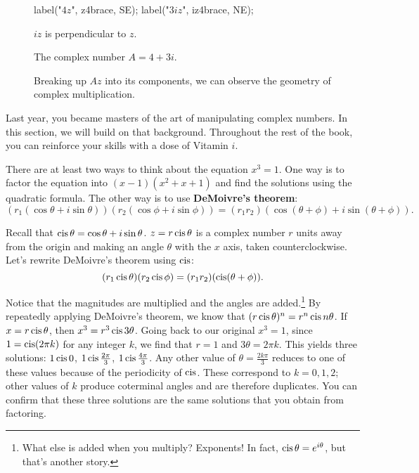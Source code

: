 \documentclass[../textbook.tex]{subfiles}
\begin{document}
\begin{figure}[h]
\begin{center}
\begin{minipage}[b]{0.4\textwidth}
\begin{asy}[width=0.7\textwidth]
				label("$4z$", z4brace, SE);
				label("$3iz$", iz4brace, NE);
			\end{asy}
		\end{minipage}
	\end{center}
	\vspace*{-2\baselineskip}
	\begin{center}
		\begin{minipage}[t]{0.25\textwidth}
			\caption{$iz$ is perpendicular to $z$.}
			\label{fig:izzperp}
		\end{minipage}
		\hfill
		\begin{minipage}[t]{0.25\textwidth}
			\caption{The complex number $A=4+3i$.}
			\label{fig:lol}
		\end{minipage}
		\hfill
		\begin{minipage}[t]{0.4\textwidth}
			\caption{Breaking up $Az$ into its components, we can observe the geometry of complex multiplication.}
		\end{minipage}
	\end{center}
	\vspace*{-2\baselineskip}
\end{figure}

\noindent Last year, you became masters of the art of manipulating complex numbers. In this section, we will build on that background. Throughout the rest of the book, you can reinforce your skills with a dose of Vitamin $i$.

There are at least two ways to think about the equation $x^3 = 1$. One way is to factor the equation into $(x-1)(x^2+x+1)$ and find the solutions using the quadratic formula. The other way is to use \textbf{DeMoivre’s theorem}:
\[(r_1 (\cos \theta + i \sin \theta)) (r_2 (\cos \phi + i \sin \phi)) = (r_1r_2) (\cos(\theta + \phi) + i \sin(\theta + \phi)).\]

Recall that $\operatorname{cis} \theta = \cos \theta + i \sin \theta$. $z=r\operatorname{cis} \theta$ is a complex number $r$ units away from the origin and making an angle $\theta$ with the $x$ axis, taken counterclockwise. Let’s rewrite DeMoivre’s theorem using $\operatorname{cis}$:
\[(r_1 \operatorname{cis} \theta)(r_2 \operatorname{cis} \phi) = (r_1r_2)(\operatorname{cis}(\theta + \phi)).\]

\noindent Notice that the magnitudes are multiplied and the angles are added.\footnote{What else is added when you multiply? Exponents! In fact, $\operatorname{cis} \theta = e^{i\theta}$, but that’s another story.} By repeatedly applying DeMoivre's theorem, we know that $(r \operatorname{cis} \theta) ^ n = r^n \operatorname{cis} n\theta$. If $x = r \operatorname{cis} \theta$, then $x^3 = r^3 \operatorname{cis} 3\theta$. Going back to our original $x^3 = 1$, since $1 = \operatorname{cis}(2\pi k)$ for any integer $k$, we find that $r = 1$ and $3\theta = 2\pi k$. This yields three solutions: $1 \operatorname{cis} 0$, $1 \operatorname{cis} \frac{2\pi}{3}$, $1 \operatorname{cis} \frac{4\pi}{3}$. Any other value of $\theta=\frac{2k\pi}{3}$ reduces to one of these values because of the periodicity of $\operatorname{cis}$. These correspond to $k = 0, 1, 2$; other values of $k$ produce coterminal angles and are therefore duplicates. You can confirm that these three solutions are the same solutions that you obtain from factoring.
\end{document}
